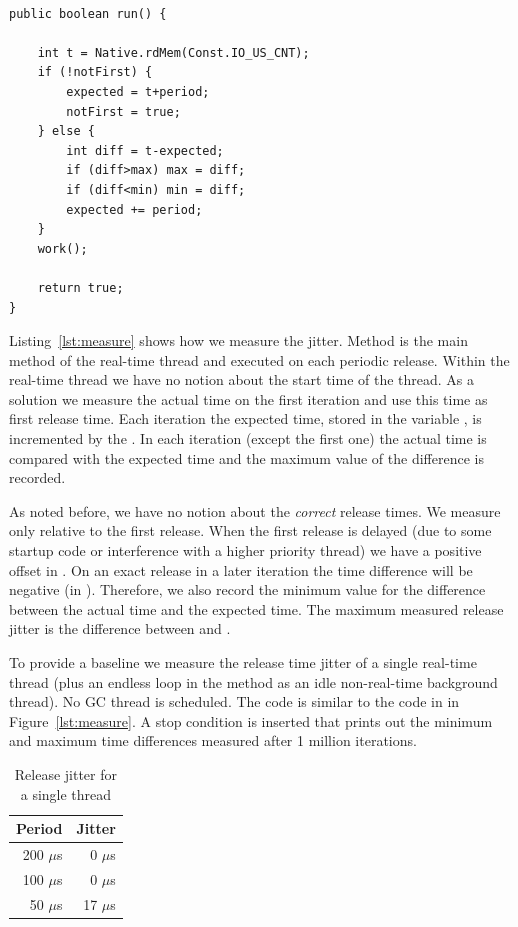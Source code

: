 \begin{lstlisting}[float, caption={Measuring release time jitter},
label=lst:measure]

public boolean run() {

    int t = Native.rdMem(Const.IO_US_CNT);
    if (!notFirst) {
        expected = t+period;
        notFirst = true;
    } else {
        int diff = t-expected;
        if (diff>max) max = diff;
        if (diff<min) min = diff;
        expected += period;
    }
    work();

    return true;
}
\end{lstlisting}

Listing~\ref{lst:measure} shows how we measure the jitter. Method
 is the main method of the real-time thread and executed
on each periodic release. Within the real-time thread we have no
notion about the start time of the thread. As a solution we measure
the actual time on the first iteration and use this time as first
release time. Each iteration the expected time, stored in the
variable , is incremented by the . In
each iteration (except the first one) the actual time is compared
with the expected time and the maximum value of the difference is
recorded.

As noted before, we have no notion about the \emph{correct} release
times. We measure only relative to the first release. When the first
release is delayed (due to some startup code or interference with a
higher priority thread) we have a positive offset in
. On an exact release in a later iteration the time
difference will be negative (in ). Therefore, we also
record the minimum value for the difference between the actual time
and the expected time. The maximum measured release jitter is the
difference between  and .

To provide a baseline we measure the release time jitter of a single
real-time thread (plus an endless loop in the  method as
an idle non-real-time background thread). No GC thread is scheduled.
The code is similar to the code in in Figure~\ref{lst:measure}. A
stop condition is inserted that prints out the minimum and maximum
time differences measured after 1 million iterations.

\begin{table}
    \centering
    \begin{tabular}{rr}
    \toprule
    Period & Jitter \\
    \midrule
    200 $\mu$s & 0 $\mu$s \\
    100 $\mu$s & 0 $\mu$s \\
    50 $\mu$s & 17 $\mu$s \\
    \bottomrule
    \end{tabular}
    \caption{Release jitter for a single thread}
    \label{tab:single}
\end{table}

